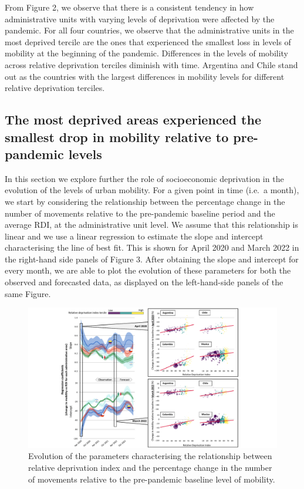 \documentclass[
  11pt,
]{article}
\begin{document}
From Figure 2, we observe that there is a consistent tendency in how
administrative units with varying levels of deprivation were affected by
the pandemic. For all four countries, we observe that the administrative
units in the most deprived tercile are the ones that experienced the
smallest loss in levels of mobility at the beginning of the pandemic.
Differences in the levels of mobility across relative deprivation
terciles diminish with time. Argentina and Chile stand out as the
countries with the largest differences in mobility levels for different
relative deprivation terciles.

\subsection{The most deprived areas experienced the smallest drop in
mobility relative to pre-pandemic
levels}\label{the-most-deprived-areas-experienced-the-smallest-drop-in-mobility-relative-to-pre-pandemic-levels}

In this section we explore further the role of socioeconomic deprivation
in the evolution of the levels of urban mobility. For a given point in
time (i.e.~a month), we start by considering the relationship between
the percentage change in the number of movements relative to the
pre-pandemic baseline period and the average RDI, at the administrative
unit level. We assume that this relationship is linear and we use a
linear regression to estimate the slope and intercept characterising the
line of best fit. This is shown for April 2020 and March 2022 in the
right-hand side panels of Figure 3. After obtaining the slope and
intercept for every month, we are able to plot the evolution of these
parameters for both the observed and forecasted data, as displayed on
the left-hand-side panels of the same Figure.

\begin{figure}[H]

{\centering \includegraphics{figures/regression-evo-nobackground.pdf}

}

\caption{Evolution of the parameters characterising the relationship
between relative deprivation index and the percentage change in the
number of movements relative to the pre-pandemic baseline level of
mobility.}

\end{figure}%
\end{document}
